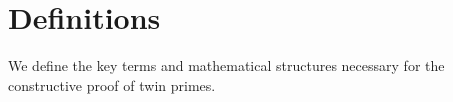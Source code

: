 \section*{Definitions}
We define the key terms and mathematical structures necessary for the constructive proof of twin primes.